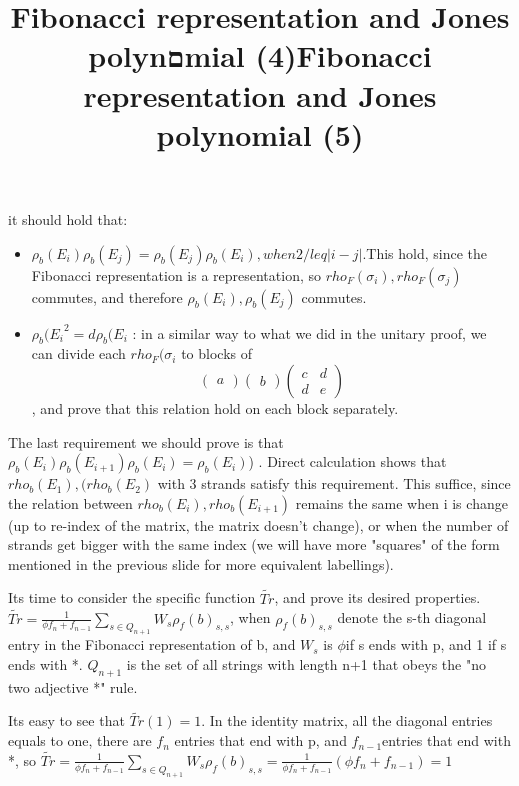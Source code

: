 \documentclass{article}
\begin{document}
{it should hold that:
\begin{itemize}
\item \(\rho_{b}(E_{i})\rho_{b}(E_{j}) = \rho_{b}(E_{j})\rho_{b}(E_{i}), when 2 /leq |i-j|\).This hold, since the Fibonacci representation is a representation, so \(rho_{F}(\sigma_{i}),rho_{F}(\sigma_{j})\) commutes, and therefore \(\rho_{b}(E_{i}),\rho_{b}(E_{j})\) commutes.
\item  \({\rho_{b}(E_{i}}^{2} = d\rho_{b}(E_{i}\) : in a similar way to what we did in the unitary proof, we can divide each  \(rho_{F}(\sigma_{i}\) to blocks of
\[
\begin{pmatrix} a \end{pmatrix}
\begin{pmatrix} b \end{pmatrix}
\begin{pmatrix} c & d \\ d & e \end{pmatrix}
\], and prove that this relation hold on each block separately.  
\end{itemize}



\title{Fibonacci representation and Jones polynםmial (4)}
The last requirement we should prove is that  
 \(\rho_{b}(E_{i})\rho_{b}(E_{i+1})\rho_{b}(E_{i}) = \rho_{b}(E_{i})\))
 . Direct calculation shows that \(rho_{b}(E_{1}), (rho_{b}(E_{2})\) with 3 strands satisfy this requirement. This suffice, since the relation between \(rho_{b}(E_{i}), rho_{b}(E_{i+1})\) remains the same when i is change (up to re-index of the matrix, the matrix doesn't change), or when the number of strands get bigger with the same index (we will have more "squares" of the form mentioned in the previous slide for more equivalent labellings).


\title{Fibonacci representation and Jones polynomial (5)}
Its time to consider the specific function \(\tilde{Tr}\), and prove its desired properties.
\(\tilde{Tr} = \frac{1}{{\phi}f_{n}+f_{n-1}}\sum\limits_{s \in Q_{n+1}}{W_{s}}\rho_{f}(b)_{s,s}\),
when \(\rho_{f}(b)_{s,s}\) denote the s-th diagonal entry in the Fibonacci representation of b,
and \(W_{s}\) is \(\phi\)if s ends with p, and 1 if s ends with *. \(Q_{n+1}\) is the set of all strings with length n+1 that obeys the "no two adjective *" rule. 

Its easy to see that \(\tilde{Tr}(1) = 1\). In the identity matrix, all the diagonal entries equals to one, there are \(f_{n}\) entries that end with p, and \(f_{n-1}\)entries that end with *, so 
\(\tilde{Tr} = \frac{1}{{\phi}f_{n}+f_{n-1}}\sum\limits_{s \in Q_{n+1}}{W_{s}}\rho_{f}(b)_{s,s} =
 \frac{1}{{\phi}f_{n}+f_{n-1}} ({\phi}f_{n}+f_{n-1}) = 1\)


}
\end{document}
